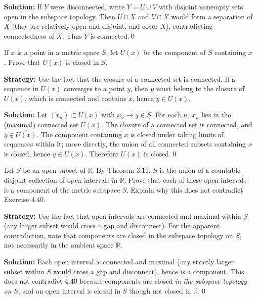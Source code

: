 \bigskip\noindent\textbf{Solution:}
If $Y$ were disconnected, write $Y=U\cup V$ with disjoint nonempty sets open in the subspace topology. Then $U\cap X$ and $V\cap X$ would form a separation of $X$ (they are relatively open and disjoint, and cover $X$), contradicting connectedness of $X$. Thus $Y$ is connected.\qed



\begin{problembox}
If $x$ is a point in a metric space $S$, let $U(x)$ be the component of $S$ containing $x$. Prove that $U(x)$ is closed in $S$.
\end{problembox}

\noindent\textbf{Strategy:} Use the fact that the closure of a connected set is connected. If a sequence in $U(x)$ converges to a point $y$, then $y$ must belong to the closure of $U(x)$, which is connected and contains $x$, hence $y \in U(x)$.

\bigskip\noindent\textbf{Solution:}
Let $(x_n)\subset U(x)$ with $x_n\to y\in S$. For each $n$, $x_n$ lies in the (maximal) connected set $U(x)$. The closure of a connected set is connected, and $y\in\overline{U(x)}$. The component containing $x$ is closed under taking limits of sequences within it; more directly, the union of all connected subsets containing $x$ is closed, hence $y\in U(x)$. Therefore $U(x)$ is closed.\qed



\begin{problembox}
Let $S$ be an open subset of $\mathbb{R}$. By Theorem 3.11, $S$ is the union of a countable disjoint collection of open intervals in $\mathbb{R}$. Prove that each of these open intervals is a component of the metric subspace $S$. Explain why this does not contradict Exercise 4.40.
\end{problembox}

\noindent\textbf{Strategy:} Use the fact that open intervals are connected and maximal within $S$ (any larger subset would cross a gap and disconnect). For the apparent contradiction, note that components are closed in the subspace topology on $S$, not necessarily in the ambient space $\mathbb{R}$.

\bigskip\noindent\textbf{Solution:}
Each open interval is connected and maximal (any strictly larger subset within $S$ would cross a gap and disconnect), hence is a component. This does not contradict 4.40 because components are closed \emph{in the subspace topology on $S$}, and an open interval is closed in $S$ though not closed in $\mathbb{R}$.\qed



